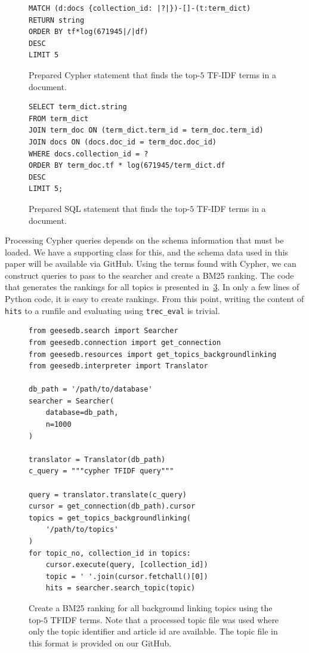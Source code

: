 \begin{figure}
	\begin{verbatim}
MATCH (d:docs {collection_id: |?|})-[]-(t:term_dict)
RETURN string
ORDER BY tf*log(671945|/|df)
DESC
LIMIT 5
	\end{verbatim}
	\caption{Prepared Cypher statement that finds the top-$5$ TF-IDF terms in a document.}
	\label{fig:tfidf-cypher}
\end{figure}
\begin{figure}
	\begin{verbatim}
SELECT term_dict.string
FROM term_dict
JOIN term_doc ON (term_dict.term_id = term_doc.term_id)
JOIN docs ON (docs.doc_id = term_doc.doc_id)
WHERE docs.collection_id = ?
ORDER BY term_doc.tf * log(671945/term_dict.df
DESC
LIMIT 5;
	\end{verbatim}
	\caption{Prepared SQL statement that finds the top-$5$ TF-IDF terms in a document.}
	\label{fig:tfidf}
\end{figure}
Processing Cypher queries depends on the schema information that must be loaded. We have a supporting class for this, and the schema data used in this paper will be available via GitHub. Using the terms found with Cypher, we can construct queries to pass to the searcher and create a BM25 ranking. The code that generates the rankings for all topics is presented in~\cref{fig:code_bm25_background_linking}. In only a few lines of Python code, it is easy to create rankings. From this point, writing the content of \texttt{hits} to a runfile and evaluating using \texttt{trec\_eval} is trivial. 

\begin{figure}
	\begin{verbatim}
from geesedb.search import Searcher
from geesedb.connection import get_connection
from geesedb.resources import get_topics_backgroundlinking
from geesedb.interpreter import Translator

db_path = '/path/to/database'
searcher = Searcher(
    database=db_path, 
    n=1000
)

translator = Translator(db_path)
c_query = """cypher TFIDF query"""

query = translator.translate(c_query)
cursor = get_connection(db_path).cursor
topics = get_topics_backgroundlinking(
    '/path/to/topics'
)
for topic_no, collection_id in topics:
    cursor.execute(query, [collection_id])
    topic = ' '.join(cursor.fetchall()[0])
    hits = searcher.search_topic(topic)
	\end{verbatim}
	\caption{Create a BM25 ranking for all background linking topics using the top-$5$ TFIDF terms. Note that a processed topic file was used where only the topic identifier and article id are available. The topic file in this format is provided on our GitHub.}
	\label{fig:code_bm25_background_linking}
\end{figure}

